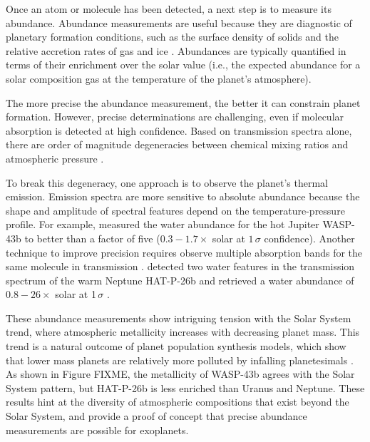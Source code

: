 \documentclass[graybox,natbib,nosecnum]{svmult}
\begin{document}
Once an atom or molecule has been detected, a next step is to measure its abundance. Abundance measurements are useful because they are diagnostic of planetary formation conditions, such as the surface density of solids and the relative accretion rates of gas and ice \citep[e.g.][]{fortney13, mordasini16}. Abundances are typically quantified in terms of their enrichment over the solar value (i.e., the expected abundance for a solar composition gas at the temperature of the planet's atmosphere).

The more precise the abundance measurement, the better it can constrain planet formation. However, precise determinations are challenging, even if molecular absorption is detected at high confidence.  Based on transmission spectra alone, there are order of magnitude degeneracies between chemical mixing ratios and atmospheric pressure \citep{benneke12, griffith13, kreidberg15b}.  

To break this degeneracy, one approach is to observe the planet's thermal emission.  Emission spectra are more sensitive to absolute abundance because the shape and amplitude of spectral features depend on the temperature-pressure profile. For example, \cite{stevenson17} measured the water abundance for the hot Jupiter WASP-43b to better than a factor of five  ($0.3 - 1.7\times$ solar at $1\,\sigma$ confidence). Another technique to improve precision requires observe multiple absorption bands for the same molecule in transmission \citep{benneke12}.  \cite{wakeford17} detected two water features in the transmission spectrum of the warm Neptune HAT-P-26b and retrieved a water abundance of $0.8 - 26\times$ solar at 1\,$\sigma$ \citep{wakeford17}.

These abundance measurements show intriguing tension with the Solar System trend, where atmospheric metallicity increases with decreasing planet mass. This trend is a natural outcome of planet population synthesis models, which show that lower mass planets are relatively more polluted by infalling planetesimals \citep{fortney13, mordasini16}. As shown in Figure FIXME, the metallicity of WASP-43b agrees with the Solar System pattern, but HAT-P-26b is less enriched than Uranus and Neptune. These results hint at the diversity of atmospheric compositions that exist beyond the Solar System, and provide a proof of concept that precise abundance measurements are possible for exoplanets. 
 
\end{document}
